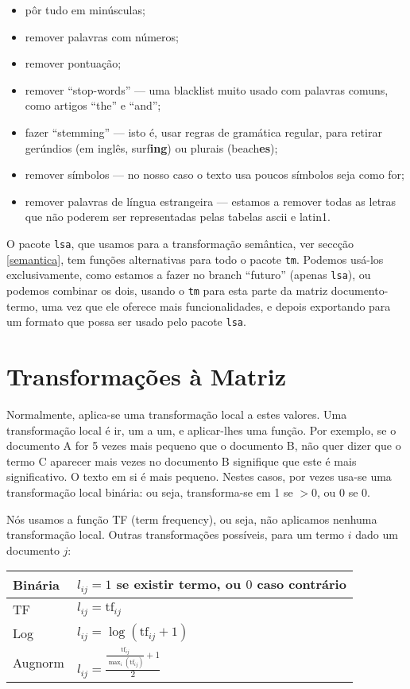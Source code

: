 \documentclass[twocolumn]{article}
\begin{document}
\begin{itemize}
\item pôr tudo em minúsculas;
\item remover palavras com números;
\item remover pontuação;
\item remover ``stop-words'' --- uma blacklist muito usado com palavras comuns, como artigos ``the'' e ``and'';
\item fazer ``stemming'' --- isto é, usar regras de gramática regular, para retirar gerúndios (em inglês, surf\textbf{ing}) ou plurais (beach\textbf{es});
\item remover símbolos --- no nosso caso o texto usa poucos símbolos seja como for;
\item remover palavras de língua estrangeira --- estamos a remover todas as letras que não poderem ser representadas pelas tabelas ascii e latin1.
\end{itemize}

O pacote \texttt{lsa}, que usamos para a transformação semântica, ver seccção \ref{semantica}, tem funções alternativas para todo o pacote \texttt{tm}. Podemos usá-los exclusivamente, como estamos a fazer no branch ``futuro'' (apenas \texttt{lsa}), ou podemos combinar os dois, usando o \texttt{tm} para esta parte da matriz documento-termo, uma vez que ele oferece mais funcionalidades, e depois exportando para um formato que possa ser usado pelo pacote \texttt{lsa}.

\section{Transformações à Matriz}

Normalmente, aplica-se uma transformação local a estes valores. Uma transformação local é ir, um a um, e aplicar-lhes uma função. Por exemplo, se o documento A for 5 vezes mais pequeno que o documento B, não quer dizer que o termo C aparecer mais vezes no documento B signifique que este é mais significativo. O texto em si é mais pequeno. Nestes casos, por vezes usa-se uma transformação local binária: ou seja, transforma-se em 1 se $> 0$, ou 0 se 0.

Nós usamos a função TF (term frequency), ou seja, não aplicamos nenhuma transformação local. Outras transformações possíveis, para um termo $i$ dado um documento $j$:

\noindent
\begin{center}
\begin{tabularx}{0.75\linewidth}{|l|X|}
\hline
	Binária & $l_{ij}=1$ se existir termo, ou $0$ caso contrário \\\hline
	TF & $l_{ij}=\mathrm{tf}_{ij}$ \\\hline
	Log & $l_{ij}=\log(\mathrm{tf}_{ij}+1)$ \\\hline
	Augnorm & $l_{ij}=\frac{\frac{\mathrm{tf}_{ij}}{\max_i(\mathrm{tf}_{ij})}+1}{2}$ \\\hline
\end{tabularx}
\end{center}
\end{document}
